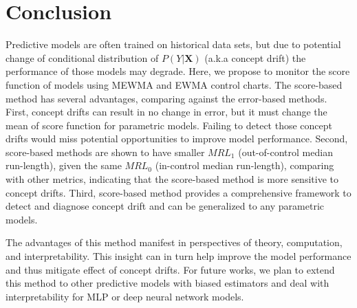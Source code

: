 \documentclass[twoside,11pt]{article}
\begin{document}
\section{Conclusion}
Predictive models are often trained on historical data sets, but due to potential change of conditional distribution of $P (Y|\bm {X})$ (a.k.a concept drift) the performance of those models may degrade. Here, we propose to monitor the score function of models using MEWMA and EWMA control charts. The score-based method has several advantages, comparing against the error-based methods. First, concept drifts can result in no change in error, but it must change the mean of score function for parametric models. Failing to detect those concept drifts would miss potential opportunities to improve model performance. Second, score-based methods are shown to have smaller $MRL_1$ (out-of-control median run-length), given the same $MRL_0$ (in-control median run-length), comparing with other metrics, indicating that the score-based method is more sensitive to concept drifts. Third, score-based method provides a comprehensive framework to detect and diagnose concept drift and can be generalized to any parametric models. 

The advantages of this method manifest in perspectives of theory, computation, and interpretability. This insight can in turn help improve the model performance and thus mitigate effect of concept drifts. For future works, we plan to extend this method to other predictive models with biased estimators and deal with interpretability for MLP or deep neural network models.




\acks{}

\end{document}
